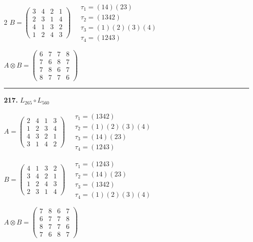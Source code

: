 \begin{multicols}{2}
$B = \begin{pmatrix} 3 & 4 & 2 & 1 \\ 2 & 3 & 1 & 4 \\ 4 & 1 & 3 & 2 \\ 1 & 2 & 4 & 3 \end{pmatrix} \quad \begin{matrix} \tau_{1}=(1 4)(2 3) \\ \tau_{2}=(1 3 4 2) \\ \tau_{3}=(1)(2)(3)(4) \\ \tau_{4}=(1 2 4 3) \end{matrix}$

$A \otimes B = \begin{pmatrix} 6 & 7 & 7 & 8 \\ 7 & 6 & 8 & 7 \\ 7 & 8 & 6 & 7 \\ 8 & 7 & 7 & 6 \end{pmatrix}$

\vspace{0.3em}
\hrule
\vspace{0.3em}

\noindent\textbf{217.} $L_{265} \circ L_{560}$

$A = \begin{pmatrix} 2 & 4 & 1 & 3 \\ 1 & 2 & 3 & 4 \\ 4 & 3 & 2 & 1 \\ 3 & 1 & 4 & 2 \end{pmatrix} \quad \begin{matrix} \tau_{1}=(1 3 4 2) \\ \tau_{2}=(1)(2)(3)(4) \\ \tau_{3}=(1 4)(2 3) \\ \tau_{4}=(1 2 4 3) \end{matrix}$

$B = \begin{pmatrix} 4 & 1 & 3 & 2 \\ 3 & 4 & 2 & 1 \\ 1 & 2 & 4 & 3 \\ 2 & 3 & 1 & 4 \end{pmatrix} \quad \begin{matrix} \tau_{1}=(1 2 4 3) \\ \tau_{2}=(1 4)(2 3) \\ \tau_{3}=(1 3 4 2) \\ \tau_{4}=(1)(2)(3)(4) \end{matrix}$

$A \otimes B = \begin{pmatrix} 7 & 8 & 6 & 7 \\ 6 & 7 & 7 & 8 \\ 8 & 7 & 7 & 6 \\ 7 & 6 & 8 & 7 \end{pmatrix}$


\end{multicols}
